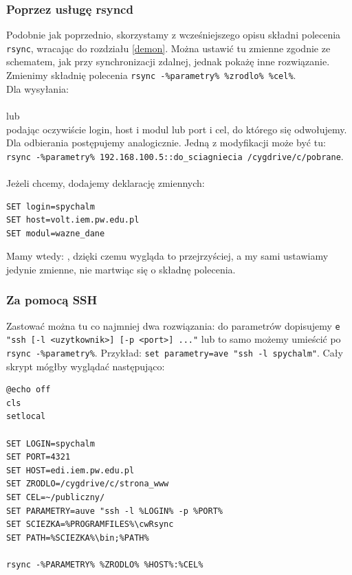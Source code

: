 \subsubsection{Poprzez usługę rsyncd}
Podobnie jak poprzednio, skorzystamy z wcześniejszego opisu składni polecenia \verb|rsync|, wracając do rozdziału \ref{demon}. Można ustawić tu zmienne zgodnie ze schematem, jak przy synchronizacji zdalnej, jednak pokażę inne rozwiązanie. Zmienimy składnię polecenia \verb|rsync -%parametry% %zrodlo% %cel%|. \\
Dla wysyłania:\\ \\lub\\  podając oczywiście login, host i modul lub port i cel, do którego się odwołujemy.\\
Dla odbierania postępujemy analogicznie. Jedną z modyfikacji może być tu: \verb|rsync -%parametry% 192.168.100.5::do_sciagniecia /cygdrive/c/pobrane|.
\\\\
Jeżeli chcemy, dodajemy deklarację zmiennych:
\begin{verbatim}
SET login=spychalm
SET host=volt.iem.pw.edu.pl
SET modul=wazne_dane
\end{verbatim}
Mamy wtedy: , dzięki czemu wygląda to przejrzyściej, a my sami ustawiamy jedynie zmienne, nie martwiąc się o składnę polecenia.

\subsubsection{Za pomocą SSH}
Zastować można tu co najmniej dwa rozwiązania: do parametrów dopisujemy \verb|e "ssh [-l <uzytkownik>] [-p <port>] ..."| lub to samo możemy umieścić po \verb|rsync -%parametry%|. Przykład: \verb|set parametry=ave "ssh -l spychalm"|. Cały skrypt mógłby wyglądać następująco:
\begin{verbatim}
@echo off
cls
setlocal

SET LOGIN=spychalm
SET PORT=4321
SET HOST=edi.iem.pw.edu.pl
SET ZRODLO=/cygdrive/c/strona_www
SET CEL=~/publiczny/
SET PARAMETRY=auve "ssh -l %LOGIN% -p %PORT%
SET SCIEZKA=%PROGRAMFILES%\cwRsync
SET PATH=%SCIEZKA%\bin;%PATH%

rsync -%PARAMETRY% %ZRODLO% %HOST%:%CEL%
\end{verbatim}

